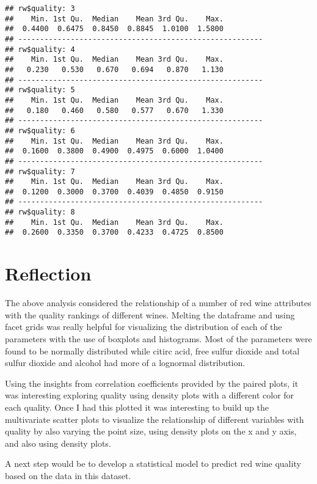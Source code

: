 \documentclass[]{article}
\begin{document}
\begin{verbatim}
## rw$quality: 3
##    Min. 1st Qu.  Median    Mean 3rd Qu.    Max. 
##  0.4400  0.6475  0.8450  0.8845  1.0100  1.5800 
## -------------------------------------------------------- 
## rw$quality: 4
##    Min. 1st Qu.  Median    Mean 3rd Qu.    Max. 
##   0.230   0.530   0.670   0.694   0.870   1.130 
## -------------------------------------------------------- 
## rw$quality: 5
##    Min. 1st Qu.  Median    Mean 3rd Qu.    Max. 
##   0.180   0.460   0.580   0.577   0.670   1.330 
## -------------------------------------------------------- 
## rw$quality: 6
##    Min. 1st Qu.  Median    Mean 3rd Qu.    Max. 
##  0.1600  0.3800  0.4900  0.4975  0.6000  1.0400 
## -------------------------------------------------------- 
## rw$quality: 7
##    Min. 1st Qu.  Median    Mean 3rd Qu.    Max. 
##  0.1200  0.3000  0.3700  0.4039  0.4850  0.9150 
## -------------------------------------------------------- 
## rw$quality: 8
##    Min. 1st Qu.  Median    Mean 3rd Qu.    Max. 
##  0.2600  0.3350  0.3700  0.4233  0.4725  0.8500
\end{verbatim}

\section{Reflection}\label{reflection}

The above analysis considered the relationship of a number of red wine
attributes with the quality rankings of different wines. Melting the
dataframe and using facet grids was really helpful for visualizing the
distribution of each of the parameters with the use of boxplots and
histograms. Most of the parameters were found to be normally distributed
while citirc acid, free sulfur dioxide and total sulfur dioxide and
alcohol had more of a lognormal distribution.

Using the insights from correlation coefficients provided by the paired
plots, it was interesting exploring quality using density plots with a
different color for each quality. Once I had this plotted it was
interesting to build up the multivariate scatter plots to visualize the
relationship of different variables with quality by also varying the
point size, using density plots on the x and y axis, and also using
density plots.

A next step would be to develop a statistical model to predict red wine
quality based on the data in this dataset.
\end{document}
